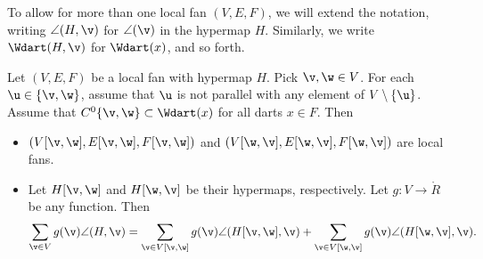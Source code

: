To allow for more than one local fan $(V,E,F)$, we will extend the notation,
writing $\angle(H,\v)$ for $\angle(\v)$ in the hypermap $H$.
Similarly, we write $\Wdart(H,\v)$ for $\Wdart(x)$, and so forth.
%
%


\begin{lemma}[slicing]\label{lemma:slice} Let
$(V,E,F)$ be a local fan with hypermap $H$.  Pick $\v,\w\in V$. For
each $\u\in \{\v,\w\}$, assume that $\u$ is not parallel with  any
element of $V\setminus\{\u\}$.  Assume that $C^0\{\v,\w\}\subset
\Wdart(x)$ for all darts $x\in F$.  Then
\begin{itemize}
\item $(V[\v,\w],E[\v,\w],F[\v,\w])$ and
$(V[\w,\v],E[\w,\v],F[\w,\v])$ are local fans.
\item Let $H[\v,\w]$ and $H[\w,\v]$ be their hypermaps, respectively.
Let $g:V\to\ring{R}$ be any function.  Then
\begin{displaymath}
  \sum_{\v\in V} g(\v)\angle(H,\v) 
  = \sum_{\v\in V[\v,\w]}g(\v)\angle(H[\v,\w],\v) 
  + \sum_{\v\in V[\w,\v]}g(\v)\angle(H[\w,\v],\v).
\end{displaymath}
\end{itemize}
\end{lemma}
%
%


